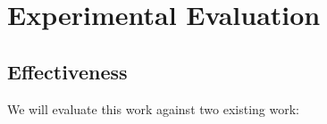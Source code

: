 \section{Experimental Evaluation}
\label{sec:evaluation}

\subsection{Effectiveness}
We will evaluate this work against two existing work:

%